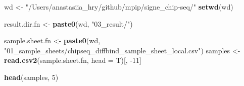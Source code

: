 \documentclass[
]{article}
\newenvironment{Shaded}{\begin{snugshade}}{\end{snugshade}}
\newcommand{\DataTypeTok}[1]{\textcolor[rgb]{0.13,0.29,0.53}{#1}}
\newcommand{\DecValTok}[1]{\textcolor[rgb]{0.00,0.00,0.81}{#1}}
\newcommand{\KeywordTok}[1]{\textcolor[rgb]{0.13,0.29,0.53}{\textbf{#1}}}
\newcommand{\NormalTok}[1]{#1}
\newcommand{\StringTok}[1]{\textcolor[rgb]{0.31,0.60,0.02}{#1}}
\begin{document}
\begin{Shaded}
\begin{Highlighting}[]
\NormalTok{wd <-}\StringTok{ "/Users/anastasiia_hry/github/mpip/signe_chip-seq/"}
\KeywordTok{setwd}\NormalTok{(wd)}

\NormalTok{result.dir.fn <-}\StringTok{ }\KeywordTok{paste0}\NormalTok{(wd, }\StringTok{"03_result/"}\NormalTok{)}

\NormalTok{sample.sheet.fn <-}\StringTok{ }\KeywordTok{paste0}\NormalTok{(wd, }\StringTok{"01_sample_sheets/chipseq_diffbind_sample_sheet_local.csv"}\NormalTok{)}
\NormalTok{samples <-}\StringTok{ }\KeywordTok{read.csv2}\NormalTok{(sample.sheet.fn, }\DataTypeTok{head =}\NormalTok{ T)[, }\DecValTok{-11}\NormalTok{]}
\end{Highlighting}
\end{Shaded}

\begin{Shaded}
\begin{Highlighting}[]
\KeywordTok{head}\NormalTok{(samples, }\DecValTok{5}\NormalTok{)}
\end{Highlighting}
\end{Shaded}
\end{document}
